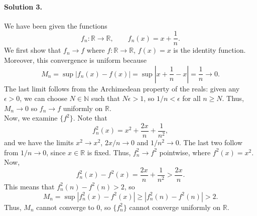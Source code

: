 \documentclass[10pt]{article}
\def\R{\mathbb{R}}
\def\N{\mathbb{N}}
\begin{document}
    \paragraph{Solution 3.} We have been given the functions \[
        f_n\colon \R \to \R, \qquad f_n(x) = x + \frac{1}{n}.
    \] We first show that $f_n \to f$ where $f\colon \R \to \R$, $f(x) = x$ is the
    identity function. Moreover, this convergence is uniform because \[
        M_n = \sup|f_n(x) - f(x)| = \sup \left|x + \frac{1}{n} - x\right| =
        \frac{1}{n} \to 0.
    \] The last limit follows from the Archimedean property of the reals: given any
    $\epsilon > 0$, we can choose $N \in \N$ such that $N\epsilon > 1$, so $1 / n <
    \epsilon$ for all $n \geq N$. Thus, $M_n \to 0$ so $f_n \to f$ uniformly on
    $\R$. \\

    Now, we examine $\{f^2\}$. Note that \[
        f_n^2(x) = x^2 + \frac{2x}{n} + \frac{1}{n^2},
    \] and we have the limits $x^2 \to x^2$, $2x / n \to 0$ and $1 / n^2 \to 0$.
    The last two follow from $1 / n \to 0$, since $x \in \R$ is fixed.
    Thus, $f^2_n \to f^2$ pointwise, where $f^2(x) = x^2$. Now, \[
        f_n^2(x) - f^2(x) = \frac{2x}{n} + \frac{1}{n^2} > \frac{2x}{n}.
    \] This means that $f_n^2(n) - f^2(n) > 2$, so \[
        M_n = \sup |f_n^2(x) - f^2(x)| \geq |f_n^2(n) - f^2(n)| > 2.
    \] Thus, $M_n$ cannot converge to $0$, so $\{f_n^2\}$ cannot converge uniformly
    on $\R$.
    
\end{document}
